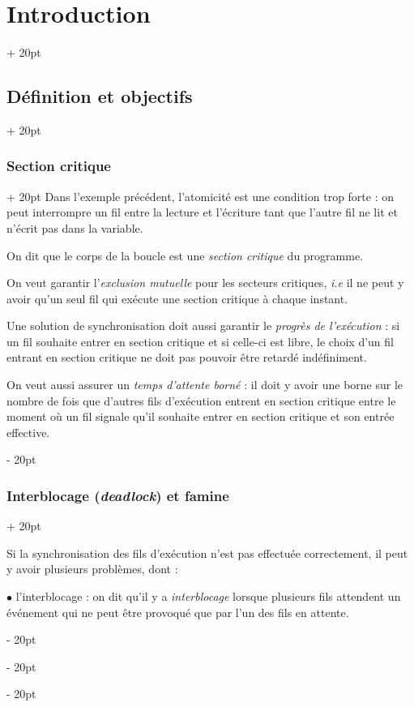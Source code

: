 \documentclass[a4paper, 12pt, twoside]{article}
\newcommand{\ind}[1][20pt]{\advance\leftskip + #1}
\newcommand{\deind}[1][20pt]{\advance\leftskip - #1}
\newenvironment{indt}[2][20pt]{#2 \par \ind[#1]}{\par \deind} %
\begin{document}
\begin{indt}{\section{Introduction}}
\begin{indt}{\subsection{Définition et objectifs}}
            \vspace{12pt}
            
            \begin{indt}{\subsubsection{Section critique}}
                Dans l'exemple précédent, l'atomicité est une condition trop forte : on peut interrompre un fil entre la lecture et l'écriture tant que l'autre fil ne lit et n'écrit pas dans la variable.

                On dit que le corps de la boucle est une \textit{\em section critique} du programme.

                On veut garantir l'\emph{\it exclusion mutuelle} pour les secteurs critiques, \textit{i.e} il ne peut y avoir qu'un seul fil qui exécute une section critique à chaque instant.

                Une solution de synchronisation doit aussi garantir le \emph{\it progrès de l'exécution} : si un fil souhaite entrer en section critique et si celle-ci est libre, le choix d'un fil entrant en section critique ne doit pas pouvoir être retardé indéfiniment.

                On veut aussi assurer un \emph{\it temps d'attente borné} : il doit y avoir une borne sur le nombre de fois que d'autres fils d'exécution entrent en section critique entre le moment où un fil signale qu'il souhaite entrer en section critique et son entrée effective.
            \end{indt}

            \vspace{12pt}
            
            \begin{indt}{\subsubsection{Interblocage (\textit{deadlock}) et famine}}
                \label{1.2.4}

                Si la synchronisation des fils d'exécution n'est pas effectuée correctement, il peut y avoir plusieurs problèmes, dont :

                \vspace{12pt}
                
                $\bullet$ l'interblocage : on dit qu'il y a \textit{interblocage} lorsque plusieurs fils attendent un événement qui ne peut être provoqué que par l'un des fils en attente.


\end{indt}
\end{indt}
\end{indt}
\end{document}
